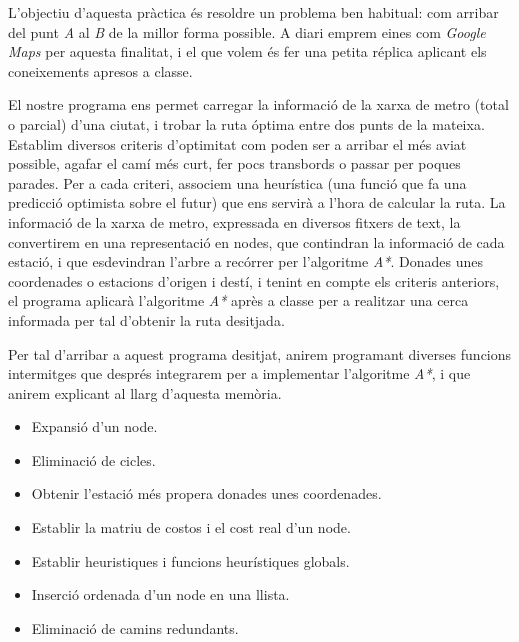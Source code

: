 \documentclass[a4paper,12pt,hidelinks]{article}
\begin{document}
        L’objectiu d’aquesta pràctica és resoldre un problema ben habitual: com arribar del punt \textit{A} al \textit{B} de la millor forma possible. A diari emprem eines com \textit{Google Maps} per aquesta finalitat, i el que volem és fer una petita réplica aplicant els coneixements apresos a classe.
        
        El nostre programa ens permet carregar la informació de la xarxa de metro (total o parcial) d’una ciutat, i trobar la ruta óptima entre dos punts de la mateixa. Establim diversos criteris d’optimitat com poden ser a arribar el més aviat possible, agafar el camí més curt, fer pocs transbords o passar per poques parades. Per a cada criteri, associem una heurística (una funció que fa una predicció optimista sobre el futur) que ens servirà a l’hora de calcular la ruta. La informació de la xarxa de metro, expressada en diversos fitxers de text, la convertirem en una representació en nodes, que contindran la informació de cada estació, i que esdevindran l’arbre a recórrer per l'algoritme \textit{A*}.
        Donades unes coordenades o estacions d'origen i destí, i tenint en compte els criteris anteriors, el programa aplicarà l’algoritme \textit{A*} après a classe per a realitzar una cerca informada per tal d’obtenir la ruta desitjada.

        Per tal d’arribar a aquest programa desitjat, anirem programant diverses funcions intermitges que després integrarem per a implementar l’algoritme \textit{A*}, i que anirem explicant al llarg d’aquesta memòria.
        \begin{itemize}
            \item Expansió d’un node.
            \item Eliminació de cicles.
            \item Obtenir l’estació més propera donades unes coordenades.
            \item Establir la matriu de costos i el cost real d’un node.
            \item Establir heuristiques i funcions heurístiques globals.
            \item Inserció ordenada d’un node en una llista.
            \item Eliminació de camins redundants.
        \end{itemize}
\end{document}

